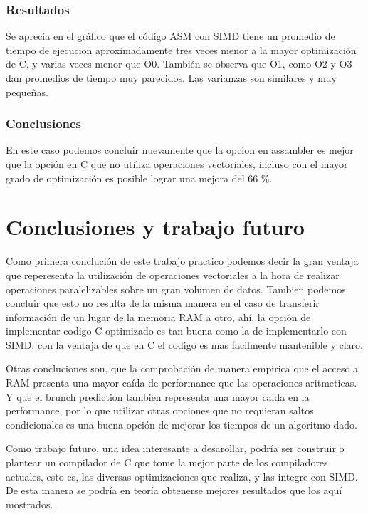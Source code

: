 \documentclass[a4paper]{article}
\begin{document}
\subsubsection{Resultados}
Se aprecia en el gráfico que el código ASM con SIMD tiene un promedio de tiempo de ejecucion aproximadamente tres veces menor a la mayor optimización de C, y varias veces menor que O0. También se observa que O1, como O2 y O3 dan promedios de tiempo muy parecidos. Las varianzas son similares y muy pequeñas.

\subsubsection{Conclusiones}

En este caso podemos concluir nuevamente que la opcion en assambler es mejor que la opción en C que no utiliza operaciones vectoriales, incluso con el mayor grado de optimización es posible lograr una mejora del 66 \%.

\newpage
\section{Conclusiones y trabajo futuro}

Como primera conclución de este trabajo practico podemos decir la gran ventaja que reperesenta la utilización de operaciones vectoriales a la hora de realizar operaciones paralelizables sobre un gran volumen de datos. Tambien podemos concluir que esto no resulta de la misma manera en el caso de transferir información de un lugar de la memoria RAM a otro, ahí, la opción de implementar codigo C optimizado es tan buena como la de implementarlo con SIMD, con la ventaja de que en C el codigo es mas facilmente mantenible y claro.

Otras concluciones son, que la comprobación de manera empirica que el acceso a RAM presenta una mayor caída de performance que las operaciones aritmeticas. Y que el brunch prediction tambien representa una mayor caida en la performance, por lo que utilizar otras opciones que no requieran saltos condicionales es una buena opción de mejorar los tiempos de un algoritmo dado.

Como trabajo futuro, una idea interesante a desarollar, podría ser construir o plantear un compilador de C que tome la mejor parte de los compiladores actuales, esto es, las diversas optimizaciones que realiza, y las integre con SIMD. De esta manera se podría en teoría obtenerse mejores resultados que los aquí mostrados.
\end{document}
